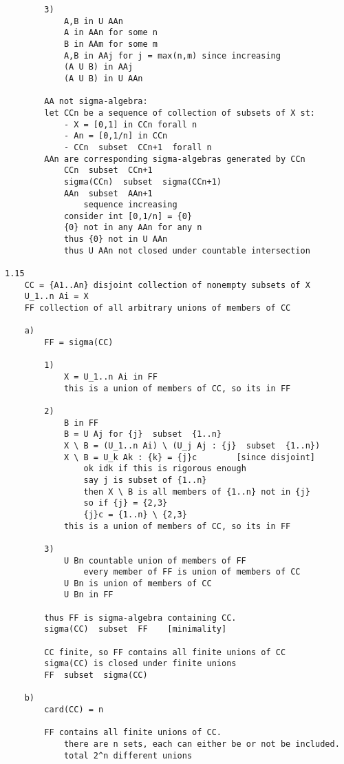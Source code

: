 \documentclass{article}
\begin{document}
\begin{flushleft}
\begin{verbatim}
        3)
            A,B in U AAn 
            A in AAn for some n 
            B in AAm for some m 
            A,B in AAj for j = max(n,m) since increasing 
            (A U B) in AAj 
            (A U B) in U AAn 

        AA not sigma-algebra:
        let CCn be a sequence of collection of subsets of X st:
            - X = [0,1] in CCn forall n 
            - An = [0,1/n] in CCn 
            - CCn  subset  CCn+1  forall n
        AAn are corresponding sigma-algebras generated by CCn 
            CCn  subset  CCn+1
            sigma(CCn)  subset  sigma(CCn+1)
            AAn  subset  AAn+1
                sequence increasing 
            consider int [0,1/n] = {0}
            {0} not in any AAn for any n 
            thus {0} not in U AAn 
            thus U AAn not closed under countable intersection 

1.15
    CC = {A1..An} disjoint collection of nonempty subsets of X 
    U_1..n Ai = X 
    FF collection of all arbitrary unions of members of CC 
    
    a)
        FF = sigma(CC)

        1)
            X = U_1..n Ai in FF 
            this is a union of members of CC, so its in FF

        2)
            B in FF 
            B = U Aj for {j}  subset  {1..n} 
            X \ B = (U_1..n Ai) \ (U_j Aj : {j}  subset  {1..n})
            X \ B = U_k Ak : {k} = {j}c        [since disjoint]
                ok idk if this is rigorous enough 
                say j is subset of {1..n}
                then X \ B is all members of {1..n} not in {j}
                so if {j} = {2,3}
                {j}c = {1..n} \ {2,3}
            this is a union of members of CC, so its in FF 

        3)
            U Bn countable union of members of FF 
                every member of FF is union of members of CC 
            U Bn is union of members of CC 
            U Bn in FF 

        thus FF is sigma-algebra containing CC. 
        sigma(CC)  subset  FF    [minimality]

        CC finite, so FF contains all finite unions of CC 
        sigma(CC) is closed under finite unions 
        FF  subset  sigma(CC)
    
    b)
        card(CC) = n 

        FF contains all finite unions of CC. 
            there are n sets, each can either be or not be included.
            total 2^n different unions 


\end{verbatim}
\end{flushleft}
\end{document}
